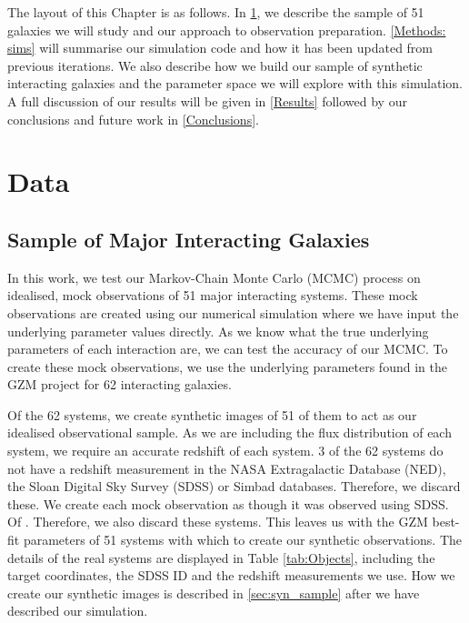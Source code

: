 The layout of this Chapter is as follows. In \DIFdelbegin {}\DIFdelend \DIFaddbegin {}\DIFaddend \ref{Data}, we describe the sample of 51 galaxies we will study and our approach to observation preparation. \DIFdelbegin {}\DIFdelend \DIFaddbegin {}\DIFaddend \ref{Methods: sims} will summarise our simulation code and how it has been updated from previous iterations. We also describe how we build our sample of synthetic interacting galaxies and the parameter space we will explore with this simulation. A full discussion of our results will be given in \DIFdelbegin {}\DIFdelend \DIFaddbegin {}\DIFaddend \ref{Results} followed by our conclusions and future work in \DIFdelbegin {}\DIFdelend \DIFaddbegin {}\DIFaddend \ref{Conclusions}.

\vspace{-5mm}
\section{Data}\label{Data}
\subsection{Sample of Major Interacting Galaxies}
\noindent In this work, we test our Markov-Chain Monte Carlo (MCMC) process on idealised, mock observations of 51 major interacting systems. These mock observations are created using our numerical simulation where we have input the underlying parameter values directly. As we know what the true underlying parameters of each interaction are, we can test the accuracy of our MCMC. To create these mock observations, we use the underlying parameters found in the GZM project for 62 interacting galaxies.

Of the 62 systems, we create synthetic images of 51 of them to act as our idealised observational sample. As we are including the flux distribution of each system, we require an accurate redshift of each system. 3 of the 62 systems do not have a redshift measurement in the NASA Extragalactic Database (NED), the Sloan Digital Sky Survey (SDSS) or Simbad databases. Therefore, we discard these. We create each mock observation as though it was observed using SDSS. Of \DIFdelbegin {}\DIFdelend \DIFaddbegin {}\DIFaddend . Therefore, we also discard these systems. This leaves us with the GZM best-fit parameters of 51 systems with which to create our synthetic observations. The details of the real systems are displayed in Table \ref{tab:Objects}, including the target coordinates, the SDSS ID and the redshift measurements we use. How we create our synthetic images is described in \DIFdelbegin {}\DIFdelend \DIFaddbegin {}\DIFaddend \ref{sec:syn_sample} after we have described our simulation.


